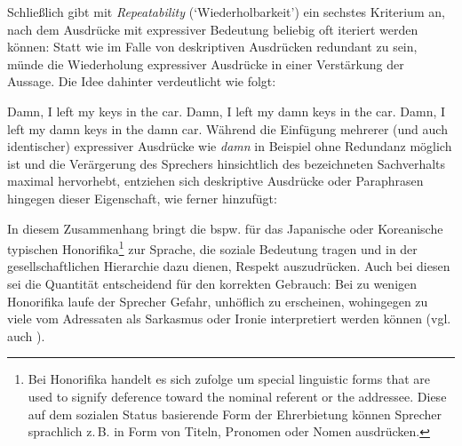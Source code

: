  Schließlich gibt \citet[182ff.]{Potts.2007a} mit \textit{Repeatability} (`Wiederholbarkeit') ein sechstes Kriterium an, nach dem Ausdrücke mit expressiver Bedeutung beliebig oft iteriert werden können: Statt wie im Falle von {deskriptiven} Ausdrücken redundant zu sein, münde die Wiederholung expressiver {Ausdrücke} in einer Verstärkung der Aussage. Die Idee dahinter verdeutlicht {\citet[182]{Potts.2007a}} wie folgt:
 
\ea   \label{damn}
\ea Damn, I left my keys in the car.
\ex Damn, I left my damn keys in the car.
\ex Damn, I left my damn keys in the damn car.
 \z
 \z
Während die Einfügung mehrerer (und auch identischer) expressiver Ausdrücke wie \textit{damn} in Beispiel  ohne Redundanz möglich ist und die Verärgerung des Sprechers hinsichtlich des bezeichneten Sachverhalts maximal hervorhebt, entziehen sich deskriptive Ausdrücke oder Paraphrasen hingegen dieser Eigenschaft, wie \citet[182]{Potts.2007a} ferner hinzufügt:

\z

In diesem Zusammenhang bringt \citet[182]{Potts.2007a} die bspw. für das Japanische oder Koreanische typischen Honorifika\footnote{Bei Honorifika handelt es sich \citet[381]{Shibatani.2009} zufolge um \glqq{}special linguistic forms that are used to signify deference toward the nominal referent or the addressee.\grqq{} Diese auf dem sozialen Status basierende Form der Ehrerbietung können Sprecher sprachlich z.\,B. in Form von Titeln, Pronomen oder Nomen ausdrücken.} zur Sprache, die soziale Bedeutung tragen und in der gesellschaftlichen Hierarchie dazu dienen, Respekt auszudrücken. Auch bei diesen sei die Quantität entscheidend für den korrekten Gebrauch: Bei zu wenigen Honorifika laufe der Sprecher Gefahr, unhöflich zu erscheinen, wohingegen zu viele vom Adressaten als Sarkasmus oder Ironie interpretiert werden können (vgl. auch {\citealt[13]{dAvis.2019b}}).

